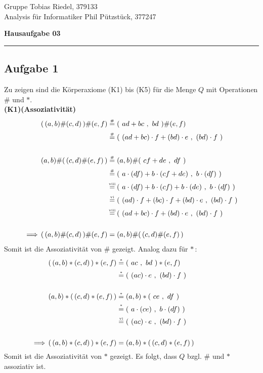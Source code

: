 \documentclass[a4paper,graphics,12pt]{article}
\newcommand{\aufgabe}[1]{\subsection*{Aufgabe #1}}
\newcommand{\up}[2]{\mathrel{\overset{\makebox[0pt]{\mbox{\normalfont\tiny #2}}}{#1}}}
\newcommand{\pair}[2]{(\ #1\ ,\ #2\ )}
\begin{document}
\noindent Gruppe              \hfill Tobias Riedel, 379133 \\
\noindent Analysis für Informatiker             \hfill Phil Pützstück, 377247 \\

\begin{center}
	\LARGE{\textbf{Hausaufgabe 03}}
\end{center}
\begin{center}
\rule[0.1ex]{\textwidth}{1pt}
\end{center}



\aufgabe{1}
    Zu zeigen sind die Körperaxiome (K1) bis (K5) für die Menge $Q$ mit Operationen
    $\#$ und $*$.\\

\textbf{(K1)(Assoziativität)}
    \begin{align*}
        (\,(a,b) \# (c,d)\,) \# (e,f) &\up{=}{\#} \pair{ad + bc}{bd} \# (e,f) \\[1pt]
        &\up{=}{\#}\pair{(ad + bc)\cdot f + (bd)\cdot e}{(bd)\cdot f} \\[15pt]
        (a,b) \# (\,(c,d) \# (e,f)\,) &\up{=}{\#} (a,b) \# \pair{cf+de}{df} \\[1pt]
        &\up{=}{\#}\pair{a\cdot (df) + b\cdot (cf+de)}{b\cdot (df)} \\[1pt]
        &\up{=}{viii} \pair{a\cdot (df) + b\cdot (cf) + b\cdot (de)}{ b\cdot (df)} \\[1pt]
        &\up{=}{vi} \pair{(ad)\cdot f + (bc)\cdot f + (bd)\cdot e}{(bd)\cdot f} \\[1pt]
        &\up{=}{viii} \pair{(ad + bc)\cdot f + (bd)\cdot e}{(bd)\cdot f} \\[15pt]
        \,\Longrightarrow\, (\,(a,b) \# (c,d)\,) \# (e,f) &= (a,b) \# (\,(c,d) \# (e,f)\,)
    \end{align*}
    Somit ist die Assoziativität von $\#$ gezeigt. Analog dazu für $*$\,:
    \begin{align*}
        (\,(a,b) * (c,d)\,) * (e,f) &\up{=}{$*$} \pair{ac}{bd} * (e,f)\qquad\qquad\qquad\ \ \ \\[1pt]
        &\up{=}{$*$} \pair{(ac)\cdot e}{(bd)\cdot f}\\[15pt]
        (a,b) * (\,(c,d) * (e,f)\,) &\up{=}{$*$} (a,b) * \pair{ce}{df}\\[1pt]
        &\up{=}{*} \pair{a\cdot (ce)}{b\cdot (df)}\\[1pt]
        &\up{=}{vi} \pair{(ac)\cdot e}{(bd)\cdot f}\\[15pt]
        \,\Longrightarrow\, (\,(a,b) * (c,d)\,) * (e,f) &= (a,b) * (\,(c,d) * (e,f)\,)
    \end{align*}
    Somit ist die Assoziativität von $*$ gezeigt. Es folgt, dass $Q$ bzgl. $\#$ und $*$ 
    assoziativ ist.
\end{document}
